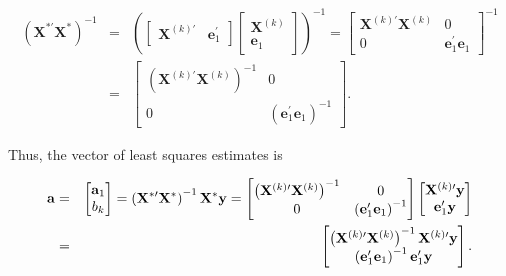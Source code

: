 \begin{center}
\begin{eqnarray*}
\left( \mathbf{X}^{\ast \prime }\mathbf{X}^{\ast }\right) ^{-1} &=&\left(
\begin{bmatrix}
\mathbf{X}^{(k)\prime } & \mathbf{e}_{1}^{\prime }%
\end{bmatrix}%
\begin{bmatrix}
\mathbf{X}^{(k)} \\
\mathbf{e}_{1}%
\end{bmatrix}%
\right) ^{-1}=%
\begin{bmatrix}
\mathbf{X}^{(k)\prime }\mathbf{X}^{(k)} & 0 \\
0 & \mathbf{e}_{1}^{\prime }\mathbf{e}_{1}%
\end{bmatrix}%
^{-1} \\
&=&%
\begin{bmatrix}\label{E5:OVXPX}
\left( \mathbf{X}^{(k)\prime }\mathbf{X}^{(k)}\right) ^{-1} & 0 \\
0 & \left( \mathbf{e}_{1}^{\prime }\mathbf{e}_{1}\right) ^{-1}%
\end{bmatrix}.
\end{eqnarray*}
\end{center}

Thus, the vector of least squares estimates is

\begin{center}
\begin{eqnarray} \label{E5:OVLSEstimates}
\mathbf{a} &=&%
\begin{bmatrix} \notag
\mathbf{a}_{1} \\
b_{k}%
\end{bmatrix}
=\left( \mathbf{X}^{\ast \prime }\mathbf{X}^{\ast }\right) ^{-1}\mathbf{X}%
^{\ast }\mathbf{y}=%
\begin{bmatrix} \notag
\left( \mathbf{X}^{(k)\prime }\mathbf{X}^{(k)}\right) ^{-1} & 0 \\
0 & \left( \mathbf{e}_{1}^{\prime }\mathbf{e}_{1}\right) ^{-1}%
\end{bmatrix}%
\begin{bmatrix} \notag
\mathbf{X}^{(k)\prime }\mathbf{y} \\
\mathbf{e}_{1}^{\prime }\mathbf{y}%
\end{bmatrix}
\\
&=&%
\begin{bmatrix}
\left( \mathbf{X}^{(k)\prime }\mathbf{X}^{(k)}\right) ^{-1}\mathbf{X}%
^{(k)\prime }\mathbf{y} \\
\left( \mathbf{e}_{1}^{\prime }\mathbf{e}_{1}\right) ^{-1}%
\mathbf{e}_{1}^{\prime }\mathbf{y}%
\end{bmatrix}.
\end{eqnarray}
\end{center}

